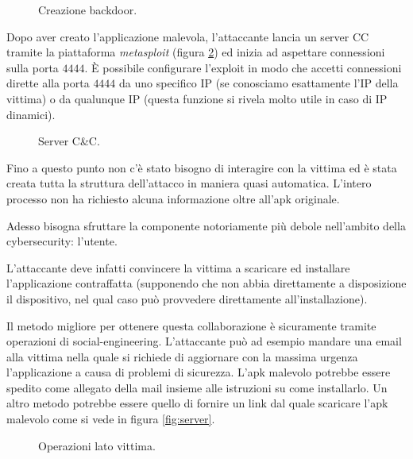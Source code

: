 \begin{figure}[h]
	\centering
	\caption{Creazione backdoor.}
	\label{fig:backdoor} 
\end{figure}

Dopo aver creato l'applicazione malevola, l'attaccante lancia un server \ac{CC} tramite la piattaforma \emph{metasploit} (figura \ref{fig:metasploit}) ed inizia ad aspettare connessioni sulla porta $4444$. È possibile configurare l'exploit in modo che accetti connessioni dirette alla porta $4444$ da uno specifico IP (se conosciamo esattamente l'IP della vittima) o da qualunque IP (questa funzione si rivela molto utile in caso di IP dinamici).

\begin{figure}[h]
	\centering
	\caption{Server C\&C.}
	\label{fig:metasploit} 
\end{figure}

Fino a questo punto non c'è stato bisogno di interagire con la vittima ed è stata creata tutta la struttura dell'attacco in maniera quasi automatica. L'intero processo non ha richiesto alcuna informazione oltre all'apk originale.

Adesso bisogna sfruttare la componente notoriamente più debole nell'ambito della cybersecurity: l'utente.

L'attaccante deve infatti convincere la vittima a scaricare ed installare l'applicazione contraffatta (supponendo che non abbia direttamente a disposizione il dispositivo, nel qual caso può provvedere direttamente all'installazione).

Il metodo migliore per ottenere questa collaborazione è sicuramente tramite operazioni di social-engineering. L'attaccante può ad esempio mandare una email alla vittima nella quale si richiede di aggiornare con la massima urgenza l'applicazione a causa di problemi di sicurezza. L'apk malevolo potrebbe essere spedito come allegato della mail insieme alle istruzioni su come installarlo. Un altro metodo potrebbe essere quello di fornire un link dal quale scaricare l'apk malevolo come si vede in figura \ref{fig:server}.

\begin{figure}[h]
	\centering
	\caption{Operazioni lato vittima.}
\end{figure}

